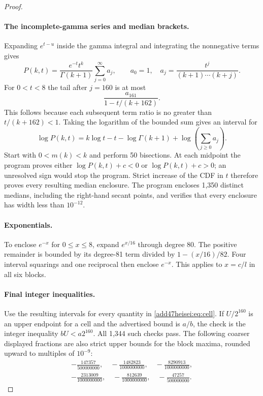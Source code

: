 \documentclass[11pt,a4paper]{article}
\numberwithin{equation}{section}
\theoremstyle{definition}
\theoremstyle{remark}
\begin{document}
\begin{proof}
\paragraph{The incomplete-gamma series and median brackets.}
Expanding $e^{t-u}$ inside the gamma integral and integrating the
nonnegative terms gives
\[
 P(k,t)=\frac{e^{-t}t^k}{\Gamma(k+1)}
 \sum_{j=0}^{\infty}a_j,
 \qquad a_0=1,\quad a_j=\frac{t^j}{(k+1)\cdots(k+j)}.
\]
For $0<t<8$ the tail after $j=160$ is at most
\[
 \frac{a_{161}}{1-t/(k+162)}.
\]
This follows because each subsequent term ratio is no greater than
$t/(k+162)<1$. Taking the logarithm of the bounded sum gives an interval
for
\[
 \log P(k,t)=k\log t-t-\log\Gamma(k+1)
                  +\log\left(\sum_{j\ge0}a_j\right).
\]
Start with $0<m(k)<k$ and perform 50 bisections. At each midpoint the
program proves either $\log P(k,t)+c<0$ or $\log P(k,t)+c>0$; an
unresolved sign would stop the program. Strict increase of the CDF in
$t$ therefore proves every resulting median enclosure. The program
encloses 1,350 distinct medians, including the right-hand secant points,
and verifies that every enclosure has width less than $10^{-12}$.

\paragraph{Exponentials.}
To enclose $e^{-x}$ for $0\le x\le8$, expand $e^{x/16}$ through degree
80. The positive remainder is bounded by its degree-81 term divided by
$1-(x/16)/82$. Four interval squarings and one reciprocal then enclose
$e^{-x}$. This applies to $x=c/l$ in all six blocks.

\paragraph{Final integer inequalities.}
Use the resulting intervals for every quantity in \eqref{add47heisei:eq:cell}.
If $U/2^{160}$ is an upper endpoint for a cell and the advertised bound
is $a/b$, the check is the integer inequality $bU<a2^{160}$.
All 1,344 such checks pass. The following coarser displayed fractions
are also strict upper bounds for the block maxima, rounded upward to
multiples of $10^{-9}$:
\[
\begin{gathered}
 -\frac{147357}{500000000},\quad
 -\frac{1482823}{1000000000},\quad
 -\frac{8290913}{1000000000},\\[3pt]
 -\frac{2313009}{1000000000},\quad
 -\frac{812639}{1000000000},\quad
 -\frac{47257}{500000000}.
\end{gathered}
\]
\end{proof}
\end{document}

